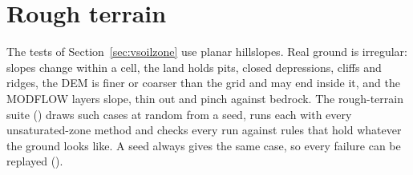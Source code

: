 \section{Rough terrain}\label{sec:vrough}
The tests of Section~\ref{sec:vsoilzone} use planar hillslopes. Real ground is irregular: slopes change within a cell,
the land holds pits, closed depressions, cliffs and ridges, the DEM is finer or coarser than the grid and may end inside
it, and the MODFLOW layers slope, thin out and pinch against bedrock. The rough-terrain suite
() draws such cases at random from a seed, runs each with every
unsaturated-zone method and checks every run against rules that hold whatever the ground looks like. A seed always gives
the same case, so every failure can be replayed ().

